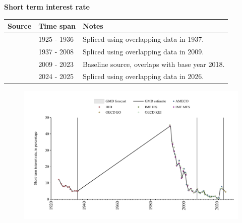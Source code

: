 \documentclass[12pt,a4paper,landscape]{article}
\begin{document}
\begin{adjustbox}{max totalsize={\paperwidth}{\paperheight},center}
\begin{minipage}[t][\textheight][t]{\textwidth}
\vspace*{0.5cm}
{}
\begin{center}
{\Large\bfseries Short term interest rate}
\end{center}
\vspace{0.5cm}
\begin{table}[H]
\centering
\small
\begin{tabular}{|l|l|l|}
\hline
\textbf{Source} & \textbf{Time span} & \textbf{Notes} \\
\hline
\rowcolor{white}\cite{IHD}& 1925 - 1936 &Spliced using overlapping data in 1937. \\
\rowcolor{lightgray}\cite{IMF_MFS}& 1937 - 2008 &Spliced using overlapping data in 2009. \\
\rowcolor{white}\cite{OECD_KEI}& 2009 - 2023 &Baseline source, overlaps with base year 2018. \\
\rowcolor{lightgray}\cite{OECD_EO}& 2024 - 2025 &Spliced using overlapping data in 2026. \\
\hline
\end{tabular}
\end{table}
\begin{figure}[H]
\centering
\includegraphics[width=\textwidth,height=0.6\textheight,keepaspectratio]{graphs/POL_strate.pdf}
\end{figure}
\end{minipage}
\end{adjustbox}
\end{document}
